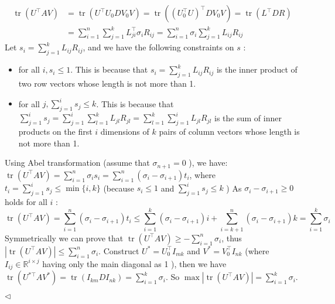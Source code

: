 \documentclass[11pt]{article}
\newenvironment{answer}[1][Answer]{\begin{trivlist}
\item[\hskip \labelsep {\bfseries #1.}\hskip \labelsep]}{\hfill$\lhd$\end{trivlist}}
\begin{document}
\begin{answer}
\begin{itemize}
\begin{itemize}
$$\begin{aligned}\operatorname{tr}\left(U^{\top} A V\right)&=\operatorname{tr}\left(U^{\top} U_0 D V_0 V\right)=\operatorname{tr}\left(\left(U_0^{\top} U\right)^{\top} D V_0 V\right)=\operatorname{tr}\left(L^{\top} D R\right)\\ &=\sum_{i=1}^n \sum_{j=1}^k L_{j i}^{\top} \sigma_i R_{i j}=\sum_{i=1}^n \sigma_i \sum_{j=1}^k L_{i j} R_{i j}\end{aligned}$$
Let $s_i=\sum_{j=1}^k L_{i j} R_{i j}$, and we have the following constraints on $s$ :
\begin{itemize}
    \item for all $i, s_i \leq 1$.
This is because that $s_i=\sum_{j=1}^k L_{i j} R_{i j}$ is the inner product of two row vectors whose length is not more than 1.
    \item for all $j, \sum_{j=1}^i s_j \leq k$.
This is because that $\sum_{j=1}^i s_j=\sum_{j=1}^i \sum_{l=1}^k L_{j l} R_{j l}=\sum_{l=1}^k \sum_{j=1}^i L_{j l} R_{j l}$ is the sum of inner products on the first $i$ dimensions of $k$ pairs of column vectors whose length is not more than 1.
\end{itemize}

Using Abel transformation (assume that $\sigma_{n+1}=0$ ), we have:
$\operatorname{tr}\left(U^{\top} A V\right)=\sum_{i=1}^n \sigma_i s_i=\sum_{i=1}^n\left(\sigma_i-\sigma_{i+1}\right) t_i$, where $t_i=\sum_{j=1}^i s_j \leq \min \{i, k\}$ (because $s_i \leq 1$ and $\sum_{j=1}^i s_j \leq k$ ) As $\sigma_i-\sigma_{i+1} \geq 0$ holds for all $i$ :
$$\operatorname{tr}\left(U^{\top} A V\right)=\sum_{i=1}^n\left(\sigma_i-\sigma_{i+1}\right) t_i \leq \sum_{i=1}^k\left(\sigma_i-\sigma_{i+1}\right) i+\sum_{i=k+1}^n\left(\sigma_i-\sigma_{i+1}\right) k=\sum_{i=1}^k \sigma_i$$
Symmetrically we can prove that $\operatorname{tr}\left(U^{\top} A V\right) \geq-\sum_{i=1}^n \sigma_i$, thus $\left|\operatorname{tr}\left(U^{\top} A V\right)\right| \leq \sum_{i=1}^n \sigma_i$.
Construct $U^*=U_0^{\top} I_{m k}$ and $V^*=V_0^{\top} I_{n k}$ (where $I_{i j} \in \mathbb{R}^{i \times j}$ having only the main diagonal as 1 ), then we have $\operatorname{tr}\left(U^{* \top} A V^*\right)=\operatorname{tr}\left(I_{k m} D I_{n k}\right)=\sum_{i=1}^k \sigma_i$.
So $\max \left|\operatorname{tr}\left(U^{\top} A V\right)\right|=\sum_{i=1}^k \sigma_i$.


\end{itemize}
\end{itemize}
\end{answer}
\end{document}
